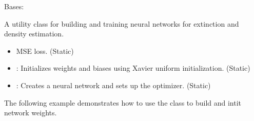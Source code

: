 \documentclass[letterpaper,10pt,english]{sphinxmanual}
\begin{document}
\begin{fulllineitems}
\label{\detokenize{NetworkHelper:NetworkHelper.NetworkHelper}}
\pysigstartsignatures
{}
\pysigstopsignatures
\sphinxAtStartPar
Bases: 

\sphinxAtStartPar
A utility class for building and training neural networks for extinction and density estimation.
\begin{description}
\begin{itemize}
\item {} \begin{description}
\sphinxAtStartPar
MSE loss. (Static)

\end{description}

\item {} 
\sphinxAtStartPar
{}: Initializes weights and biases using Xavier uniform initialization. (Static)

\item {} 
\sphinxAtStartPar
{}: Creates a neural network and sets up the optimizer. (Static)

\end{itemize}

\sphinxAtStartPar
The following example demonstrates how to use the  class to build and intit network weights.

\begin{sphinxVerbatim}[commandchars=\\\{\}]
     
                                                    
                                                   
\end{sphinxVerbatim}


\end{description}
\end{fulllineitems}
\end{document}
